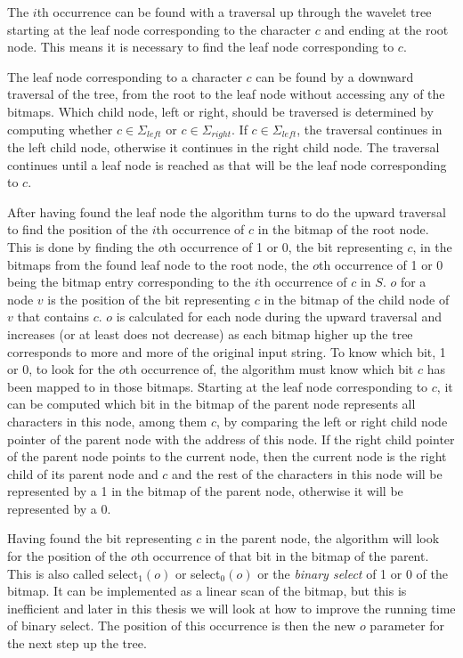 The $i$th occurrence can be found with a traversal up through the wavelet tree starting at the leaf node corresponding to the character $c$ and ending at the root node.
This means it is necessary to find the leaf node corresponding to $c$.

The leaf node corresponding to a character $c$ can be found by a downward traversal of the tree, from the root to the leaf node without accessing any of the bitmaps.
Which child node, left or right, should be traversed is determined by computing whether $c \in \Sigma_{\mathit{left}}$ or $c \in \Sigma_{\mathit{right}}$.
If $c \in \Sigma_{\mathit{left}}$, the traversal continues in the left child node, otherwise it continues in the right child node.
The traversal continues until a leaf node is reached as that will be the leaf node corresponding to $c$.



After having found the leaf node the algorithm turns to do the upward traversal to find the position of the $i$th occurrence of $c$ in the bitmap of the root node.
This is done by finding the $o$th occurrence of 1 or 0, the bit representing $c$, in the bitmaps from the found leaf node to the root node, the $o$th occurrence of 1 or 0 being the bitmap entry corresponding to the $i$th occurrence of $c$ in $S$.
$o$ for a node $v$ is the position of the bit representing $c$ in the bitmap of the child node of $v$ that contains $c$.
$o$ is calculated for each node during the upward traversal and increases (or at least does not decrease) as each bitmap higher up the tree corresponds to more and more of the original input string.
To know which bit, 1 or 0, to look for the $o$th occurrence of, the algorithm must know which bit $c$ has been mapped to in those bitmaps.
Starting at the leaf node corresponding to $c$, it can be computed which bit in the bitmap of the parent node represents all characters in this node, among them $c$, by comparing the left or right child node pointer of the parent node with the address of this node.
If the right child pointer of the parent node points to the current node, then the current node is the right child of its parent node and $c$ and the rest of the characters in this node will be represented by a 1 in the bitmap of the parent node, otherwise it will be represented by a 0.

Having found the bit representing $c$ in the parent node, the algorithm will look for the position of the $o$th occurrence of that bit in the bitmap of the parent.
This is also called select$_1(o)$ or select$_0(o)$ or the \textit{binary select} of 1 or 0 of the bitmap.
It can be implemented as a linear scan of the bitmap, but this is inefficient and later in this thesis we will look at how to improve the running time of binary select.
The position of this occurrence is then the new $o$ parameter for the next step up the tree.

